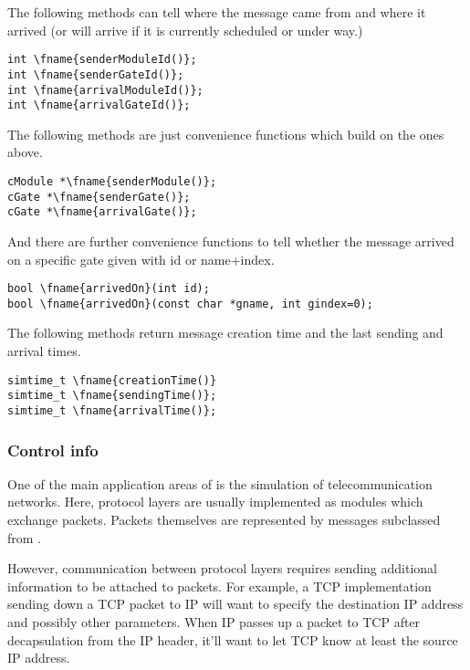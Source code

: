 The following methods can tell where the message came from and
where it arrived (or will arrive if it is currently scheduled or under way.)

\begin{Verbatim}[commandchars=\\\{\}]
int \fname{senderModuleId()};
int \fname{senderGateId()};
int \fname{arrivalModuleId()};
int \fname{arrivalGateId()};
\end{Verbatim}

The following methods are just convenience functions which build
on the ones above.

\begin{Verbatim}[commandchars=\\\{\}]
cModule *\fname{senderModule()};
cGate *\fname{senderGate()};
cGate *\fname{arrivalGate()};
\end{Verbatim}

And there are further convenience functions to tell whether
the message arrived on a specific gate given with id or
name+index.

\begin{Verbatim}[commandchars=\\\{\}]
bool \fname{arrivedOn}(int id);
bool \fname{arrivedOn}(const char *gname, int gindex=0);
\end{Verbatim}

The following methods return message creation time and the last sending
and arrival times.

\begin{Verbatim}[commandchars=\\\{\}]
simtime_t \fname{creationTime()}
simtime_t \fname{sendingTime()};
simtime_t \fname{arrivalTime()};
\end{Verbatim}

\subsubsection{Control info}

One of the main application areas of {\opp} is the simulation of
telecommunication networks. Here, protocol layers are usually
implemented as modules which exchange packets. Packets themselves
are represented by messages subclassed from .

However, communication between protocol layers requires sending
additional information to be attached to packets. For example,
a TCP implementation sending down a TCP packet to IP will want
to specify the destination IP address and possibly
other parameters. When IP passes up a packet to TCP after
decapsulation from the IP header, it'll want to let TCP know
at least the source IP address.

